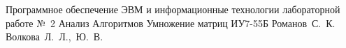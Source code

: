 \documentclass{bmstu}
\begin{document}
{Программное обеспечение ЭВМ и информационные технологии}
{лабораторной работе №~2}
{Анализ Алгоритмов}
{Умножение матриц}
{}
{ИУ7-55Б}
{Романов~С.~К.}
{Волкова~Л.~Л.,~Ю.~В.}

\tableofcontents






%
%
%
%

\makebibliography
\end{document}
